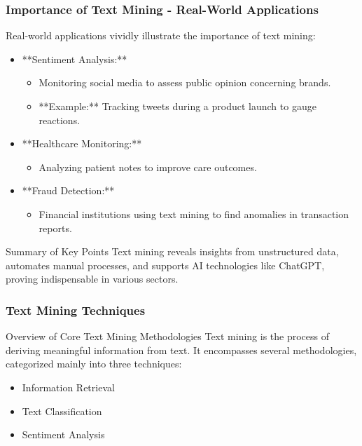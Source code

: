 \documentclass[aspectratio=169]{beamer}
\begin{document}
\begin{frame}[fragile]
    \frametitle{Importance of Text Mining - Real-World Applications}
    
    Real-world applications vividly illustrate the importance of text mining:

    \begin{itemize}
        \item **Sentiment Analysis:**
            \begin{itemize}
                \item Monitoring social media to assess public opinion concerning brands.
                \item **Example:** Tracking tweets during a product launch to gauge reactions.
            \end{itemize}
        
        \item **Healthcare Monitoring:**
            \begin{itemize}
                \item Analyzing patient notes to improve care outcomes.
            \end{itemize}
        
        \item **Fraud Detection:**
            \begin{itemize}
                \item Financial institutions using text mining to find anomalies in transaction reports.
            \end{itemize}
    \end{itemize}
    
    \begin{block}{Summary of Key Points}
        Text mining reveals insights from unstructured data, automates manual processes, and supports AI technologies like ChatGPT, proving indispensable in various sectors.
    \end{block}
\end{frame}

\begin{frame}[fragile]
    \frametitle{Text Mining Techniques}
    \begin{block}{Overview of Core Text Mining Methodologies}
        Text mining is the process of deriving meaningful information from text. 
        It encompasses several methodologies, categorized mainly into three techniques:
        \begin{itemize}
            \item Information Retrieval
            \item Text Classification
            \item Sentiment Analysis
        \end{itemize}
    \end{block}
\end{frame}
\end{document}
